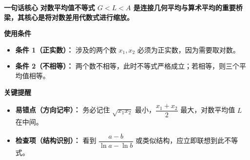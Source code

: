 \begin{summarybox}
\textbf{\textcolor{CSummary}{一句话核心}}
\textbf{对数平均值不等式 $G < L < A$ 是连接几何平均与算术平均的重要桥梁，其核心是将对数差用代数式进行缩放。}

\medskip
\textbf{\textcolor{CSummary}{使用条件}}
\begin{itemize}[leftmargin=*, itemsep=0.5em, topsep=0.4em]
    \item \textbf{条件 1（正实数）：} 涉及的两个数 $x_1, x_2$ 必须为正实数，因为需要取对数。
    \item \textbf{条件 2（不相等）：} 两个数不相等，此时不等式严格成立；若相等，则三个平均值相等。
\end{itemize}

\medskip
\textbf{\textcolor{CSummary}{关键提醒}}
\begin{itemize}[leftmargin=*, itemsep=0.5em, topsep=0.4em]
    \item \textbf{易错点（方向记牢）：} 务必记住 $\sqrt{x_1 x_2}$ 最小，$\dfrac{x_1+x_2}{2}$ 最大，对数平均值 $L$ 在中间。
    \item \textbf{检查项（结构识别）：} 看到 $\dfrac{a-b}{\ln a - \ln b}$ 或类似结构，应立即联想到此不等式。
\end{itemize}
\end{summarybox}
